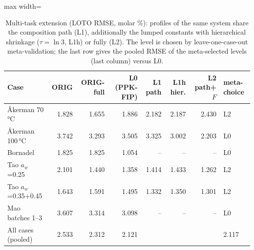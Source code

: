 \begin{table}[t]
\centering
\caption{Multi-task extension (LOTO RMSE, molar \%): profiles of the same system share the composition path (L1), additionally the lumped constants with hierarchical shrinkage ($\tau=\ln3$, L1h) or fully (L2). The level is chosen by leave-one-case-out meta-validation; the last row gives the pooled RMSE of the meta-selected levels (last column) versus L0.}\label{tab:pooling}
\footnotesize
\begin{adjustbox}{max width=\linewidth}
\begin{tabular}{lrrrrrrl}
\toprule
Case & ORIG & ORIG-full & L0 (PPK-FIP) & L1 path & L1h hier. & L2 path+$F$ & meta-choice \\
\midrule
Åkerman 70\,°C & 1.828 & 1.655 & 1.886 & 2.182 & 2.187 & 2.430 & L2 \\
Åkerman 100\,°C & 3.742 & 3.293 & 3.505 & 3.325 & 3.002 & 2.203 & L0 \\
Bornadel & 1.825 & 1.825 & 1.054 & -- & -- & -- & L0 \\
Tao $a_w$=0.25 & 2.101 & 1.440 & 1.358 & 1.414 & 1.433 & 1.262 & L2 \\
Tao $a_w$=0.35+0.45 & 1.643 & 1.591 & 1.495 & 1.332 & 1.350 & 1.301 & L2 \\
Mao batches 1--3 & 3.607 & 3.314 & 3.098 & -- & -- & -- & L0 \\
\midrule
All cases (pooled) & 2.533 & 2.312 & 2.121 &  &  &  & 2.117 \\
\bottomrule
\end{tabular}
\end{adjustbox}
\end{table}
